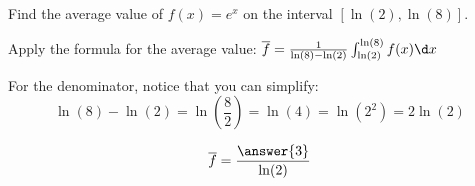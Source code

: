 \documentclass{ximera}
\author{Steven Gubkin\and Nela Lakos \and Bobby Ramsey}
\begin{document}
\begin{exercise}

Find the average value of $f(x)=e^x$ on the interval $[\ln(2),\ln(8)]$.
\begin{hint}
	Apply the formula for the average value:
	 $\overline{f}=\frac{1}{\ln(8)-\ln(2)}\int_{\ln(2)}^{\ln(8) }f(x)\d x$
\end{hint}
\begin{hint}
	For the denominator, notice that you can simplify:
	\[
	\ln(8)-\ln(2)=\ln\left(\frac{8}{2}\right)=\ln(4)=\ln(2^2)=2\ln (2)
	\]
\end{hint}
\begin{prompt}
	\[
	\overline{f}=\frac{\answer{3}}{\ln(2)}
	\]
\end{prompt}

\end{exercise}
\end{document}

